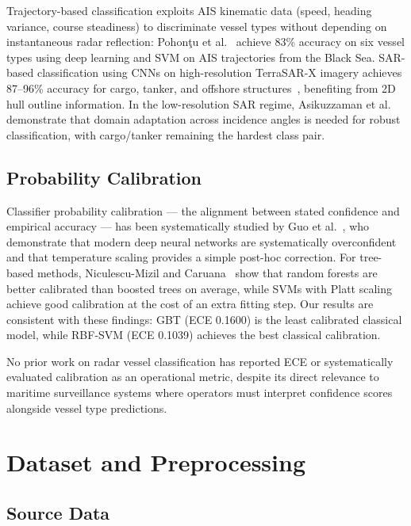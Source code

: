 \documentclass[journal]{IEEEtran}
\begin{document}
Trajectory-based classification exploits AIS kinematic data (speed, heading variance, course steadiness) to discriminate vessel types without depending on instantaneous radar reflection: Pohon\c{t}u et al.~\cite{pohontzu2023trajectory} achieve 83\% accuracy on six vessel types using deep learning and SVM on AIS trajectories from the Black Sea. SAR-based classification using CNNs on high-resolution TerraSAR-X imagery achieves 87--96\% accuracy for cargo, tanker, and offshore structures~\cite{bentes2017sar}, benefiting from 2D hull outline information. In the low-resolution SAR regime, Asikuzzaman et al.~\cite{asikuzzaman2025sar} demonstrate that domain adaptation across incidence angles is needed for robust classification, with cargo/tanker remaining the hardest class pair.

\subsection{Probability Calibration}

Classifier probability calibration --- the alignment between stated confidence and empirical accuracy --- has been systematically studied by Guo et al.~\cite{guo2017calibration}, who demonstrate that modern deep neural networks are systematically overconfident and that temperature scaling provides a simple post-hoc correction. For tree-based methods, Niculescu-Mizil and Caruana~\cite{niculescumizil2005calibration} show that random forests are better calibrated than boosted trees on average, while SVMs with Platt scaling achieve good calibration at the cost of an extra fitting step. Our results are consistent with these findings: GBT (ECE 0.1600) is the least calibrated classical model, while RBF-SVM (ECE 0.1039) achieves the best classical calibration.

No prior work on radar vessel classification has reported ECE or systematically evaluated calibration as an operational metric, despite its direct relevance to maritime surveillance systems where operators must interpret confidence scores alongside vessel type predictions.

\section{Dataset and Preprocessing}
\label{sec:data}

\subsection{Source Data}
\end{document}
